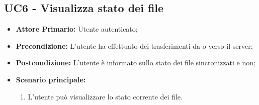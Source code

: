 \subsection{UC6 - Visualizza stato dei file}
\begin{itemize}
\item \textbf{Attore Primario:} Utente autenticato;
\item \textbf{Precondizione:} L'utente ha effettuato dei trasferimenti da o verso il server;
\item \textbf{Postcondizione:} L'utente è informato sullo stato dei file sincronizzati e non;
\item \textbf{Scenario principale:}
    \begin{enumerate}
    \item L'utente può visualizzare lo stato corrente dei file.
    \end{enumerate}
\end{itemize}